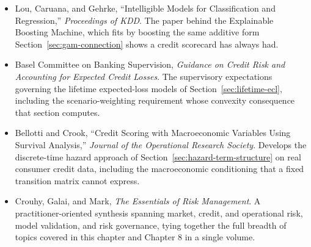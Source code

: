 \documentclass[../ai_in_finance]{subfiles}
\begin{document}
\begin{itemize}
    \item Lou, Caruana, and Gehrke, ``Intelligible Models for Classification and Regression,'' \emph{Proceedings of KDD}. The paper behind the Explainable Boosting Machine, which fits by boosting the same additive form Section~\ref{sec:gam-connection} shows a credit scorecard has always had.
    \item Basel Committee on Banking Supervision, \emph{Guidance on Credit Risk and Accounting for Expected Credit Losses}. The supervisory expectations governing the lifetime expected-loss models of Section~\ref{sec:lifetime-ecl}, including the scenario-weighting requirement whose convexity consequence that section computes.
    \item Bellotti and Crook, ``Credit Scoring with Macroeconomic Variables Using Survival Analysis,'' \emph{Journal of the Operational Research Society}. Develops the discrete-time hazard approach of Section~\ref{sec:hazard-term-structure} on real consumer credit data, including the macroeconomic conditioning that a fixed transition matrix cannot express.
    \item Crouhy, Galai, and Mark, \emph{The Essentials of Risk Management}. A practitioner-oriented synthesis spanning market, credit, and operational risk, model validation, and risk governance, tying together the full breadth of topics covered in this chapter and Chapter 8 in a single volume.
\end{itemize}
\end{document}
